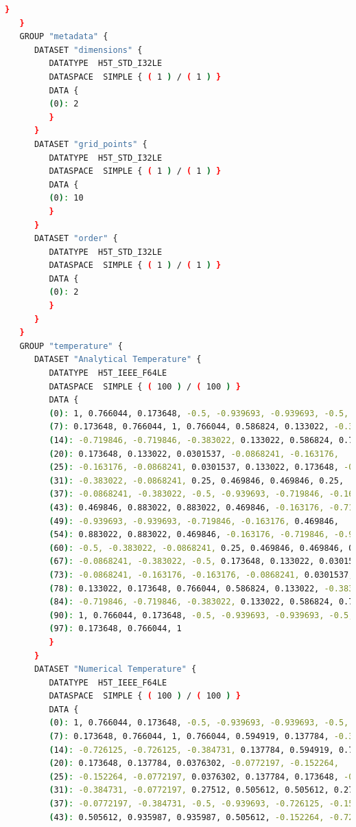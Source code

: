 \documentclass[12 pt, final]{article}
\begin{document}
\begin{itemize}
\begin{lstlisting}[language=bash,escapechar=\%]
      }
   }
   GROUP "metadata" {
      DATASET "dimensions" {
         DATATYPE  H5T_STD_I32LE
         DATASPACE  SIMPLE { ( 1 ) / ( 1 ) }
         DATA {
         (0): 2
         }
      }
      DATASET "grid_points" {
         DATATYPE  H5T_STD_I32LE
         DATASPACE  SIMPLE { ( 1 ) / ( 1 ) }
         DATA {
         (0): 10
         }
      }
      DATASET "order" {
         DATATYPE  H5T_STD_I32LE
         DATASPACE  SIMPLE { ( 1 ) / ( 1 ) }
         DATA {
         (0): 2
         }
      }
   }
   GROUP "temperature" {
      DATASET "Analytical Temperature" {
         DATATYPE  H5T_IEEE_F64LE
         DATASPACE  SIMPLE { ( 100 ) / ( 100 ) }
         DATA {
         (0): 1, 0.766044, 0.173648, -0.5, -0.939693, -0.939693, -0.5,
         (7): 0.173648, 0.766044, 1, 0.766044, 0.586824, 0.133022, -0.383022,
         (14): -0.719846, -0.719846, -0.383022, 0.133022, 0.586824, 0.766044,
         (20): 0.173648, 0.133022, 0.0301537, -0.0868241, -0.163176,
         (25): -0.163176, -0.0868241, 0.0301537, 0.133022, 0.173648, -0.5,
         (31): -0.383022, -0.0868241, 0.25, 0.469846, 0.469846, 0.25,
         (37): -0.0868241, -0.383022, -0.5, -0.939693, -0.719846, -0.163176,
         (43): 0.469846, 0.883022, 0.883022, 0.469846, -0.163176, -0.719846,
         (49): -0.939693, -0.939693, -0.719846, -0.163176, 0.469846,
         (54): 0.883022, 0.883022, 0.469846, -0.163176, -0.719846, -0.939693,
         (60): -0.5, -0.383022, -0.0868241, 0.25, 0.469846, 0.469846, 0.25,
         (67): -0.0868241, -0.383022, -0.5, 0.173648, 0.133022, 0.0301537,
         (73): -0.0868241, -0.163176, -0.163176, -0.0868241, 0.0301537,
         (78): 0.133022, 0.173648, 0.766044, 0.586824, 0.133022, -0.383022,
         (84): -0.719846, -0.719846, -0.383022, 0.133022, 0.586824, 0.766044,
         (90): 1, 0.766044, 0.173648, -0.5, -0.939693, -0.939693, -0.5,
         (97): 0.173648, 0.766044, 1
         }
      }
      DATASET "Numerical Temperature" {
         DATATYPE  H5T_IEEE_F64LE
         DATASPACE  SIMPLE { ( 100 ) / ( 100 ) }
         DATA {
         (0): 1, 0.766044, 0.173648, -0.5, -0.939693, -0.939693, -0.5,
         (7): 0.173648, 0.766044, 1, 0.766044, 0.594919, 0.137784, -0.384731,
         (14): -0.726125, -0.726125, -0.384731, 0.137784, 0.594919, 0.766044,
         (20): 0.173648, 0.137784, 0.0376302, -0.0772197, -0.152264,
         (25): -0.152264, -0.0772197, 0.0376302, 0.137784, 0.173648, -0.5,
         (31): -0.384731, -0.0772197, 0.27512, 0.505612, 0.505612, 0.27512,
         (37): -0.0772197, -0.384731, -0.5, -0.939693, -0.726125, -0.152264,
         (43): 0.505612, 0.935987, 0.935987, 0.505612, -0.152264, -0.726125,

\end{lstlisting}
\end{itemize}
\end{document}
